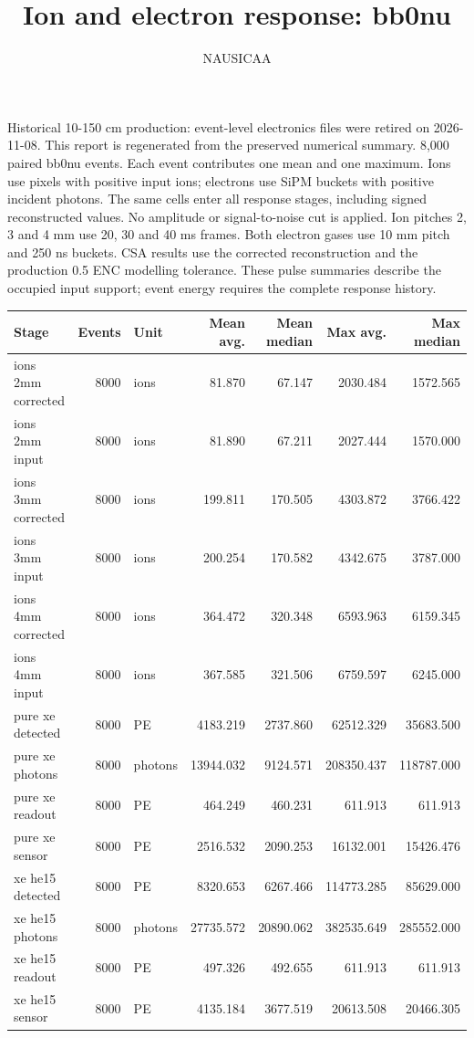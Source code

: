 \documentclass[10pt]{article}
\begin{document}
\title{Ion and electron response: bb0nu}\author{NAUSICAA}\date{}\maketitle
Historical 10-150 cm production: event-level electronics files were retired on 2026-11-08. This report is regenerated from the preserved numerical summary. 8,000 paired bb0nu events. Each event contributes one mean and one maximum. Ions use pixels with positive input ions; electrons use SiPM buckets with positive incident photons. The same cells enter all response stages, including signed reconstructed values. No amplitude or signal-to-noise cut is applied. Ion pitches 2, 3 and 4 mm use 20, 30 and 40 ms frames. Both electron gases use 10 mm pitch and 250 ns buckets. CSA results use the corrected reconstruction and the production 0.5 ENC modelling tolerance. These pulse summaries describe the occupied input support; event energy requires the complete response history.
\begin{center}\scriptsize
\begin{tabular}{lrlrrrr}\toprule
Stage & Events & Unit & Mean avg. & Mean median & Max avg. & Max median \\ \midrule
ions 2mm corrected & 8000 & ions & 81.870 & 67.147 & 2030.484 & 1572.565 \\
ions 2mm input & 8000 & ions & 81.890 & 67.211 & 2027.444 & 1570.000 \\
ions 3mm corrected & 8000 & ions & 199.811 & 170.505 & 4303.872 & 3766.422 \\
ions 3mm input & 8000 & ions & 200.254 & 170.582 & 4342.675 & 3787.000 \\
ions 4mm corrected & 8000 & ions & 364.472 & 320.348 & 6593.963 & 6159.345 \\
ions 4mm input & 8000 & ions & 367.585 & 321.506 & 6759.597 & 6245.000 \\
pure xe detected & 8000 & PE & 4183.219 & 2737.860 & 62512.329 & 35683.500 \\
pure xe photons & 8000 & photons & 13944.032 & 9124.571 & 208350.437 & 118787.000 \\
pure xe readout & 8000 & PE & 464.249 & 460.231 & 611.913 & 611.913 \\
pure xe sensor & 8000 & PE & 2516.532 & 2090.253 & 16132.001 & 15426.476 \\
xe he15 detected & 8000 & PE & 8320.653 & 6267.466 & 114773.285 & 85629.000 \\
xe he15 photons & 8000 & photons & 27735.572 & 20890.062 & 382535.649 & 285552.000 \\
xe he15 readout & 8000 & PE & 497.326 & 492.655 & 611.913 & 611.913 \\
xe he15 sensor & 8000 & PE & 4135.184 & 3677.519 & 20613.508 & 20466.305 \\
\bottomrule\end{tabular}\end{center}
\end{document}
